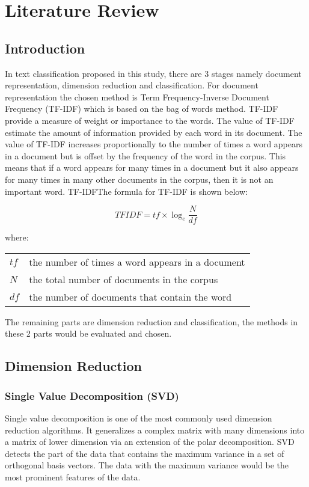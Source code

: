 \chapter{Literature Review}
\section{Introduction}
In text classification proposed in this study, there are 3 stages namely document representation, dimension reduction and classification. For document representation the chosen method is Term Frequency-Inverse Document Frequency (TF-IDF) which is based on the bag of words method. TF-IDF provide a measure of weight or importance to the words. The value of TF-IDF estimate the amount of information provided by each word in its document. \cite{tfidf} The value of TF-IDF increases proportionally to the number of times a word appears in a document but is offset by the frequency of the word in the corpus. This means that if a word appears for many times in a document but it also appears for many times in many other documents in the corpus, then it is not an important word. 
TF-IDFThe formula for TF-IDF is shown below:

\begin{equation}
TFIDF = tf \times \log_e \frac{N}{df}
\end{equation}
	
where:
	
\begin{center}
\begin{tabular}{l @{ $=$ } l}
	$tf$ & the number of times a word appears in a document \\
	$N$ & the total number of documents in the corpus \\
	$df$ & the number of documents that contain the word
\end{tabular}
\end{center}

The remaining parts are dimension reduction and classification, the methods in these 2 parts would be evaluated and chosen.
	
\section{Dimension Reduction}
\subsection{Single Value Decomposition (SVD)}
Single value decomposition is one of the most commonly used dimension reduction algorithms. It generalizes a complex matrix with many dimensions into a matrix of lower dimension via an extension of the polar decomposition. SVD detects the part of the data that contains the maximum variance in a set of orthogonal basis vectors. The data with the maximum variance would be the most prominent features of the data. \cite{svdDef}
	
